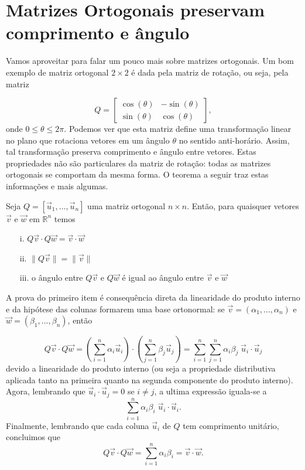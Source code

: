 \documentclass[../livro.tex]{subfiles}  %
\begin{document}
\section{Matrizes Ortogonais preservam comprimento e ângulo}

Vamos aproveitar para falar um pouco mais sobre matrizes ortogonais. Um bom exemplo de matriz ortogonal $2\times 2$ é dada pela matriz de rotação, ou seja, pela matriz

\[
Q =
\begin{bmatrix}
\cos (\theta) & -\sin (\theta) \\
\sin (\theta) & \cos (\theta) 
\end{bmatrix} ,\]
onde $0 \leq \theta \leq 2 \pi$.
Podemos ver que esta matriz define uma transformação linear no plano que rotaciona vetores em um ângulo $\theta$ no sentido anti-horário.
Assim, tal transformação preserva comprimento e ângulo entre vetores.
Estas propriedades não são particulares da matriz de rotação: todas as matrizes ortogonais se comportam da mesma forma. O teorema a seguir traz estas informações e mais algumas.

\begin{theorem}
	Seja $Q=[\vec{u}_1,...,\vec{u}_n]$ uma matriz ortogonal $n \times n$. Então, para quaisquer vetores $\vec{v}$ e $\vec{w}$ em $\mathbb{R}^n$ temos
	\begin{enumerate}
		\item[i.] $Q\vec{v} \cdot Q\vec{w} = \vec{v} \cdot  \vec{w}$
		\item[ii.]  $\| Q\vec{v} \| = \| \vec{v} \|$
		\item[iii.]  o ângulo entre $Q\vec{v}$ e $Q\vec{w}$ é igual ao  ângulo entre $\vec{v}$ e $\vec{w}$
		\end{enumerate}
\end{theorem}

A prova do primeiro item é consequência direta da linearidade do produto interno e da hipótese das colunas formarem uma base ortonormal: se $\vec{v} = (\alpha_1,..., \alpha_n)$ e $\vec{w} = (\beta_1, ..., \beta_n)$,  então

$$Q\vec{v} \cdot Q\vec{w} = \left( \sum_{i=1}^n \alpha_i \vec{u}_i \right) \cdot \left(   \sum_{j=1}^n \beta_j \vec{u}_j \right) =  \sum_{i=1}^n \sum_{j=1}^n \alpha_i \beta_j \;\vec{u}_i \cdot \vec{u}_j$$ 
devido a linearidade do produto interno (ou seja a propriedade distributiva aplicada tanto na primeira quanto na segunda componente do produto interno). Agora, lembrando que $\vec{u}_i \cdot \vec{u}_j=0$ se $i \neq j$, a ultima expressão iguala-se a 
$$ \sum_{i=1}^n \alpha_i \beta_i \; \vec{u}_i \cdot \vec{u}_i.$$
Finalmente, lembrando que cada coluna $\vec{u}_i$ de $Q$ tem comprimento unitário, concluimos que
$$Q\vec{v} \cdot Q\vec{w} = \sum_{i=1}^n \alpha_i \beta_i = \vec{v} \cdot \vec{w}.$$
 
\end{document}
